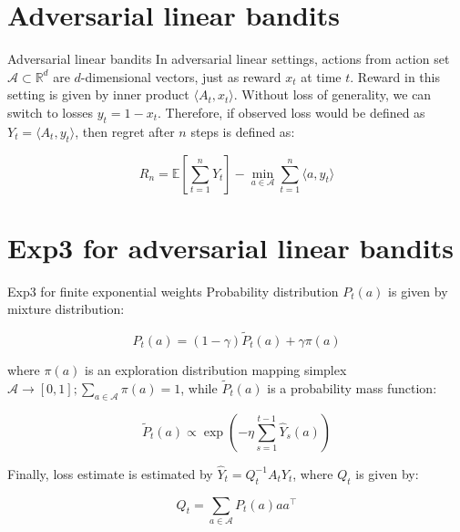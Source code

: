 \documentclass[aspectratio=169,xcolor=dvipsnames]{beamer}
\begin{document}
\section{Adversarial linear bandits}
\begin{frame}{Adversarial linear bandits}
    In adversarial linear settings, actions from action set $\mathbf{\mathcal{A}} \subset \mathbb{R}^d$ are $d$-dimensional vectors, just as reward $x_t$ at time $t$. Reward in this setting is given by inner product $\langle A_t, x_t \rangle$. Without loss of generality, we can switch to losses $y_t = 1 - x_t$. Therefore, if observed loss would be defined as $Y_t = \langle A_t, y_t \rangle$, then regret after $n$ steps is defined as:

    \begin{equation}
        R_n = \mathbb{E} \left[ \sum_{t=1}^{n} Y_t \right] - \min_{a \in \mathbf{\mathcal{A}}} \sum_{t=1}^{n} \langle a, y_t \rangle
    \end{equation}
\end{frame}

\section{Exp3 for adversarial linear bandits}
\begin{frame}{Exp3 for finite exponential weights}
    Probability distribution $P_t(a)$ is given by mixture distribution:

    \begin{equation}
        P_t(a) = (1 - \gamma)\tilde{P}_t(a) + \gamma \pi(a)
    \end{equation}

    where $\pi(a)$ is an exploration distribution mapping simplex $\mathbf{\mathcal{A}} \rightarrow [0,1] ; \sum_{a \in \mathbf{\mathcal{A}}} \pi(a) = 1$, while $\tilde{P}_t(a)$ is a probability mass function:

    \begin{equation}
        \tilde{P}_t(a) \propto \exp \left( -\eta \sum_{s=1}^{t-1} \hat{Y}_s(a) \right)
    \end{equation}

    Finally, loss estimate is estimated by $\hat{Y}_t = Q_t^{-1} A_t Y_t$, where $Q_t$ is given by:

    \begin{equation}
        Q_t = \sum_{a \in \mathbf{\mathcal{A}}} P_t(a)aa^{\intercal}
    \end{equation}

\end{frame}
\end{document}
